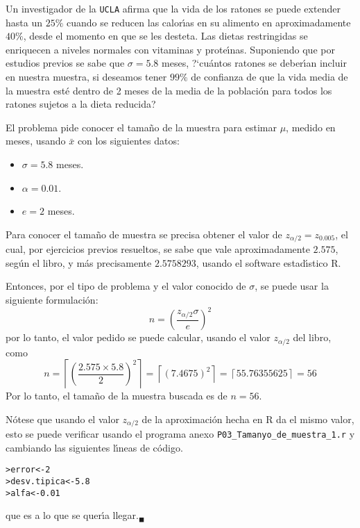 \begin{enunciado}
 Un investigador de la \texttt{UCLA} afirma que la vida de los ratones se puede extender hasta un $25\%$ cuando se reducen las calor\'{\i}as en su alimento en aproximadamente $40\%$, desde el momento en que se les desteta.
 Las dietas restringidas se enriquecen a niveles normales con vitaminas y prote\'{\i}nas.
 Suponiendo que por estudios previos se sabe que $\sigma = 5.8$ meses, ?`cu\'antos ratones se deber\'{\i}an incluir en nuestra muestra, si deseamos tener $99\%$ de confianza de que la vida media de la muestra est\'e dentro de 2 meses de la media de la poblaci\'on para todos los ratones sujetos a la dieta reducida?
\end{enunciado}

\begin{solucion}
 El problema pide conocer el tama\~no de la muestra para estimar $\mu$, medido en meses, usando $\bar{x}$ con los siguientes datos:
 \begin{itemize}
  \item $\sigma = 5.8$ meses.
  \item $\alpha=0.01$.
  \item $e=2$ meses.
 \end{itemize}
 Para conocer el tama\~no de muestra se precisa obtener el valor de $z_{\alpha/2} = z_{0.005}$, el cual, por ejercicios previos resueltos, se sabe que vale aproximadamente $2.575$, seg\'un el libro, y m\'as precisamente $2.5758293$, usando el software estad\'{\i}stico R.
 \par 
 Entonces, por el tipo de problema y el valor conocido de $\sigma$, se puede usar la siguiente formulaci\'on:
 \begin{equation*}
  n = \left( \frac{z_{\alpha/2}\sigma}{e} \right)^2
 \end{equation*}
 por lo tanto, el valor pedido se puede calcular, usando el valor $z_{\alpha/2}$ del libro, como
 \begin{equation*}
  n = \left\lceil \left( \frac{2.575\times 5.8}{2} \right)^2  \right\rceil = \left\lceil \left( 7.4675 \right)^2 \right\rceil = \left\lceil 55.76355625 \right\rceil = 56
 \end{equation*}
 Por lo tanto, el tama\~no de la muestra buscada es de $n=56$.
 \par 
 N\'otese que usando el valor $z_{\alpha/2}$ de la aproximaci\'on hecha en R da el mismo valor, esto se puede verificar usando el programa anexo \texttt{P03\_Tamanyo\_de\_muestra\_1.r} y cambiando las siguientes l\'{\i}neas de c\'odigo.
 \begin{verbatim}
>error<-2
>desv.tipica<-5.8
>alfa<-0.01
 \end{verbatim}
 \vspace{-0.5cm}
 que es a lo que se quer\'{\i}a llegar.${}_{\blacksquare}$
\end{solucion}

